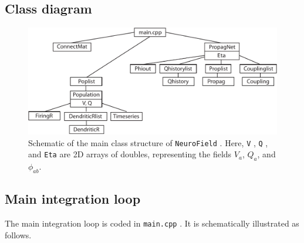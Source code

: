 \documentclass[12pt,a4paper]{article}
\newcommand{\type}[1]{ {\small\small\tt #1} }
\begin{document}
\subsection{Class diagram}

\begin{figure}[h!]\begin{center}\includegraphics[scale=.8]{class.pdf}\caption{Schematic of the main class structure of \type{NeuroField}. Here, \type{V}, \type{Q}, and \type{Eta} are 2D arrays of doubles, representing the fields $V_a$, $Q_a$, and $\phi_{ab}$.}\label{fig:class}\end{center}\end{figure}

\subsection{Main integration loop}

The main integration loop is coded in \type{main.cpp}. It is schematically illustrated as follows.
\end{document}
